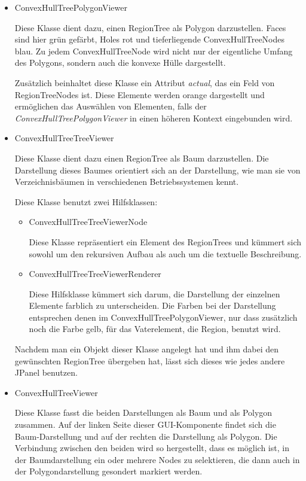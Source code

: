\begin{itemize}
\item ConvexHullTreePolygonViewer

Diese Klasse dient dazu, einen RegionTree als Polygon darzustellen. Faces sind hier grün gefärbt, Holes rot und tieferliegende ConvexHullTreeNodes blau. Zu jedem ConvexHullTreeNode wird nicht nur der eigentliche Umfang des Polygons, sondern auch die konvexe Hülle dargestellt.

Zusätzlich beinhaltet diese Klasse ein Attribut \textit{actual}, das ein Feld von RegionTreeNodes ist. Diese Elemente werden orange dargestellt und ermöglichen das Auswählen von Elementen, falls der \textit{ConvexHullTreePolygonViewer} in einen höheren Kontext eingebunden wird.

\item ConvexHullTreeTreeViewer

Diese Klasse dient dazu einen RegionTree als Baum darzustellen. Die Darstellung dieses Baumes orientiert sich an der Darstellung, wie man sie von Verzeichnisbäumen in verschiedenen Betriebssystemen kennt.

Diese Klasse benutzt zwei Hilfsklassen:
\begin{itemize}
\item ConvexHullTreeTreeViewerNode

Diese Klasse repräsentiert ein Element des RegionTrees und kümmert sich sowohl um den rekursiven Aufbau als auch um die textuelle Beschreibung.
\item ConvexHullTreeTreeViewerRenderer

Diese Hilfsklasse kümmert sich darum, die Darstellung der einzelnen Elemente farblich zu unterscheiden. Die Farben bei der Darstellung entsprechen denen im ConvexHullTreePolygonViewer, nur dass zusätzlich noch die Farbe gelb, für das Vaterelement, die Region, benutzt wird.
\end{itemize}

Nachdem man ein Objekt dieser Klasse angelegt hat und ihm dabei den gewünschten RegionTree übergeben hat, lässt sich dieses wie jedes andere JPanel benutzen.

\item ConvexHullTreeViewer

Diese Klasse fasst die beiden Darstellungen als Baum und als Polygon zusammen. Auf der linken Seite dieser GUI-Komponente findet sich die Baum-Darstellung und auf der rechten die Darstellung als Polygon. Die Verbindung zwischen den beiden wird so hergestellt, dass es möglich ist, in der Baumdarstellung ein oder mehrere Nodes zu selektieren, die dann auch in der Polygondarstellung gesondert markiert werden.


\end{itemize}
